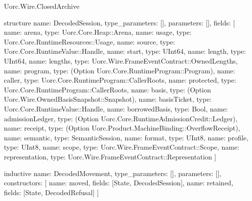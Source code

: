 \begin{lexlean}{Uorc.Wire.ClosedArchive}
\begin{semanticmodule}
structure{
  name: DecodedSession,
  type_parameters: [],
  parameters: [],
  fields: [
    {name: arena, type: Uorc.Core.Heap::Arena},
    {name: usage, type: Uorc.Core.RuntimeResources::Usage},
    {name: source, type: Uorc.Core.RuntimeValue::Handle},
    {name: start, type: UInt64},
    {name: length, type: UInt64},
    {name: lengths, type: Uorc.Wire.FrameEventContract::OwnedLengths},
    {name: program, type: (Option Uorc.Core.RuntimeProgram::Program)},
    {name: caller, type: Uorc.Core.RuntimeProgram::CallerRoots},
    {name: protected, type: Uorc.Core.RuntimeProgram::CallerRoots},
    {name: basis, type: (Option Uorc.Wire.OwnedBasisSnapshot::Snapshot)},
    {name: basisTicket, type: Uorc.Core.RuntimeValue::Handle},
    {name: borrowedBasis, type: Bool},
    {name: admissionLedger, type: (Option Uorc.Core.RuntimeAdmissionCredit::Ledger)},
    {name: receipt, type: (Option Uorc.Product.MachineBinding::OverflowReceipt)},
    {name: semantic, type: SemanticSession},
    {name: format, type: UInt8},
    {name: profile, type: UInt8},
    {name: scope, type: Uorc.Wire.FrameEventContract::Scope},
    {name: representation, type: Uorc.Wire.FrameEventContract::Representation}
  ]
}

inductive{
  name: DecodedMovement,
  type_parameters: [],
  parameters: [],
  constructors: [
    {name: moved, fields: [State, DecodedSession]},
    {name: retained, fields: [State, DecodedRefusal]}
  ]
}


\end{semanticmodule}
\end{lexlean}
